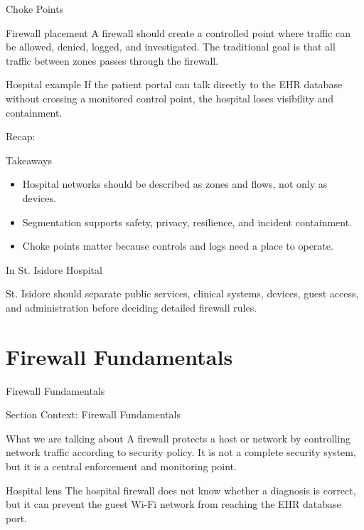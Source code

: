 \documentclass[presentation]{beamer}
\newcommand{\sectiontitleframe}[1]{
\begin{frame}[plain,c]
\begin{center}
{\usebeamerfont{title}\usebeamercolor[fg]{title}#1}
\end{center}
\end{frame}
}
\newcommand{\scenario}{St. Isidore Hospital}
\newcommand{\takeawaysframe}[2]{
\begin{frame}[c]{Recap: \insertsection}
\begin{block}{Takeaways}
#1
\end{block}
\begin{exampleblock}{In \scenario}
#2
\end{exampleblock}
\end{frame}
}
\begin{document}
\begin{frame}[c]{Choke Points}
\begin{block}{Firewall placement}
A firewall should create a controlled point where traffic can be allowed, denied, logged, and
investigated. The traditional goal is that all traffic between zones passes through the firewall.
\end{block}

\begin{exampleblock}{Hospital example}
If the patient portal can talk directly to the EHR database without crossing a monitored control
point, the hospital loses visibility and containment.
\end{exampleblock}
\end{frame}

\takeawaysframe{
\begin{itemize}
    \item Hospital networks should be described as zones and flows, not only as devices.
    \item Segmentation supports safety, privacy, resilience, and incident containment.
    \item Choke points matter because controls and logs need a place to operate.
\end{itemize}
}{
St. Isidore should separate public services, clinical systems, devices, guest access, and
administration before deciding detailed firewall rules.
}

\section{Firewall Fundamentals}
\sectiontitleframe{Firewall Fundamentals}

\begin{frame}[c]{Section Context: Firewall Fundamentals}
\begin{block}{What we are talking about}
A firewall protects a host or network by controlling network traffic according to security policy. It
is not a complete security system, but it is a central enforcement and monitoring point.
\end{block}

\begin{exampleblock}{Hospital lens}
The hospital firewall does not know whether a diagnosis is correct, but it can prevent the guest
Wi-Fi network from reaching the EHR database port.
\end{exampleblock}
\end{frame}
\end{document}

